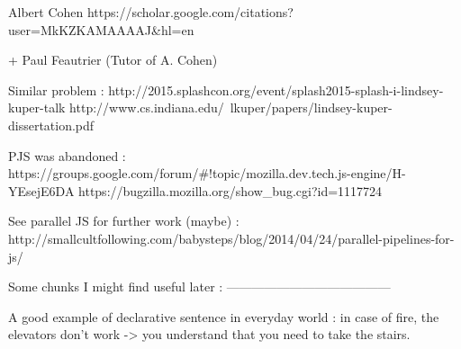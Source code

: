 Albert Cohen
https://scholar.google.com/citations?user=MkKZKAMAAAAJ&hl=en

+ Paul Feautrier (Tutor of A. Cohen)


Similar problem :
http://2015.splashcon.org/event/splash2015-splash-i-lindsey-kuper-talk
http://www.cs.indiana.edu/~lkuper/papers/lindsey-kuper-dissertation.pdf

PJS was abandoned :
https://groups.google.com/forum/#!topic/mozilla.dev.tech.js-engine/H-YEsejE6DA
https://bugzilla.mozilla.org/show_bug.cgi?id=1117724

See parallel JS for further work (maybe) :
http://smallcultfollowing.com/babysteps/blog/2014/04/24/parallel-pipelines-for-js/

Some chunks I might find useful later :
---------------------------------------

A good example of declarative sentence in everyday world : in case of fire, 
the elevators don't work -> you understand that you need to take the stairs.